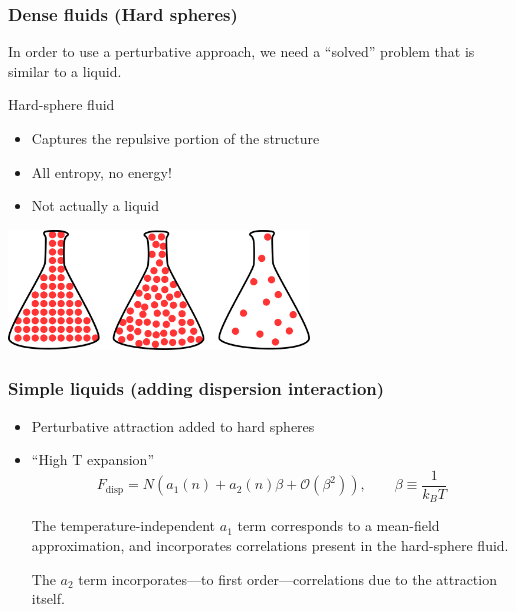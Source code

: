 
\begin{frame}
  \frametitle{Dense fluids (Hard spheres)}
  In order to use a perturbative approach, we need a ``solved''
  problem that is similar to a liquid.
  \begin{block}{Hard-sphere fluid}
    \begin{itemize}
    \item Captures the repulsive portion of the structure
    \item All entropy, no energy!
    \item Not actually a liquid
    \end{itemize}
    \begin{center}
      \includegraphics[width=8cm]{figs/hard-spheres}
    \end{center}
  \end{block}
\end{frame}

\begin{frame}
  \frametitle{Simple liquids (adding dispersion interaction)}
  \begin{itemize}
  \item Perturbative attraction added to hard spheres
  \item ``High T expansion''
    \[
    F_\text{disp} = N\left(a_1(n) + a_2(n)\beta + \mathcal{O}(\beta^2)\right),
    \quad \quad \beta \equiv \frac{1}{k_BT}
    \]

    \vspace{1em} The temperature-independent $a_1$ term corresponds to
    a mean-field approximation, and incorporates correlations present
    in the hard-sphere fluid.
    \vspace{1em}

    The $a_2$ term incorporates---to first order---correlations due to
    the attraction itself.
  \end{itemize}
\end{frame}

